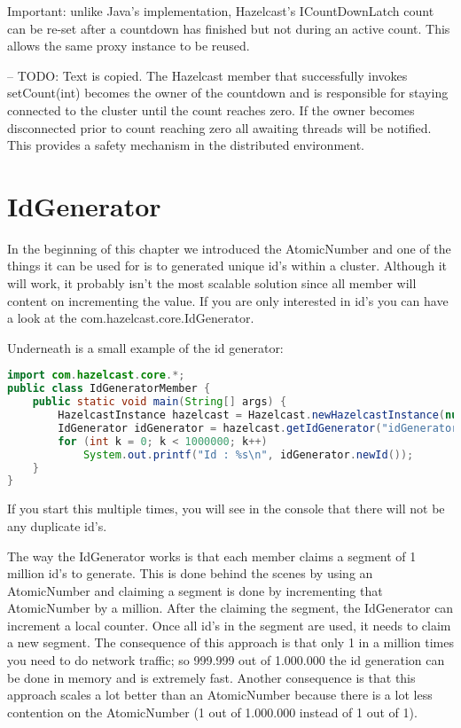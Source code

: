 Important: unlike Java's implementation, Hazelcast's ICountDownLatch count can be re-set after a countdown has finished but not during an active count. This allows the same proxy instance to be reused.

-- TODO: Text is copied.
The Hazelcast member that successfully invokes setCount(int) becomes the owner of the countdown and is responsible for staying connected to the cluster until the count reaches zero. If the owner  becomes disconnected prior to count reaching zero all awaiting threads will be notified. This provides a safety mechanism in the distributed environment.

\section{IdGenerator}
In the beginning of this chapter we introduced the AtomicNumber and one of the things it can be used for is to generated unique id's within a cluster. Although it will work, it probably isn't the most scalable solution since all member will content on incrementing the value. If you are only interested in id's you can have a look at the com.hazelcast.core.IdGenerator.

Underneath is a small example of the id generator:
\begin{lstlisting}[language=java]
import com.hazelcast.core.*;
public class IdGeneratorMember {
    public static void main(String[] args) {
        HazelcastInstance hazelcast = Hazelcast.newHazelcastInstance(null);
        IdGenerator idGenerator = hazelcast.getIdGenerator("idGenerator");
        for (int k = 0; k < 1000000; k++)
            System.out.printf("Id : %s\n", idGenerator.newId());
    }
}
\end{lstlisting}
If you start this multiple times, you will see in the console that there will not be any duplicate id's.

The way the IdGenerator works is that each member claims a segment of 1 million id's to generate. This is done behind the scenes by using an AtomicNumber and claiming a segment is done by incrementing that AtomicNumber by a million. After the claiming the segment, the IdGenerator can increment a local counter. Once all id's in the segment are used, it needs to claim a new segment. The consequence of this approach is that only 1 in a million times you need to do network traffic; so 999.999 out of 1.000.000 the id generation can be done in memory and is extremely fast. Another consequence is that this approach scales a lot better than an AtomicNumber because there is a lot less contention on the AtomicNumber (1 out of 1.000.000 instead of 1 out of 1).

